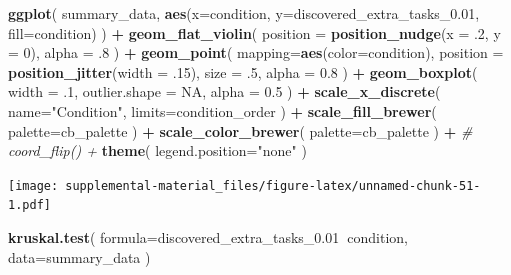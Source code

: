 \documentclass[]{book}
\newenvironment{Shaded}{\begin{snugshade}}{\end{snugshade}}
\newcommand{\CommentTok}[1]{\textcolor[rgb]{0.56,0.35,0.01}{\textit{#1}}}
\newcommand{\DataTypeTok}[1]{\textcolor[rgb]{0.13,0.29,0.53}{#1}}
\newcommand{\DecValTok}[1]{\textcolor[rgb]{0.00,0.00,0.81}{#1}}
\newcommand{\FloatTok}[1]{\textcolor[rgb]{0.00,0.00,0.81}{#1}}
\newcommand{\KeywordTok}[1]{\textcolor[rgb]{0.13,0.29,0.53}{\textbf{#1}}}
\newcommand{\NormalTok}[1]{#1}
\newcommand{\OperatorTok}[1]{\textcolor[rgb]{0.81,0.36,0.00}{\textbf{#1}}}
\newcommand{\OtherTok}[1]{\textcolor[rgb]{0.56,0.35,0.01}{#1}}
\newcommand{\StringTok}[1]{\textcolor[rgb]{0.31,0.60,0.02}{#1}}
\begin{document}
\begin{Shaded}
\begin{Highlighting}[]
\KeywordTok{ggplot}\NormalTok{(}
\NormalTok{    summary_data,}
    \KeywordTok{aes}\NormalTok{(}\DataTypeTok{x=}\NormalTok{condition, }\DataTypeTok{y=}\NormalTok{discovered_extra_tasks_}\FloatTok{0.01}\NormalTok{, }\DataTypeTok{fill=}\NormalTok{condition)}
\NormalTok{  ) }\OperatorTok{+}
\StringTok{  }\KeywordTok{geom_flat_violin}\NormalTok{(}
    \DataTypeTok{position =} \KeywordTok{position_nudge}\NormalTok{(}\DataTypeTok{x =} \FloatTok{.2}\NormalTok{, }\DataTypeTok{y =} \DecValTok{0}\NormalTok{),}
    \DataTypeTok{alpha =} \FloatTok{.8}
\NormalTok{  ) }\OperatorTok{+}
\StringTok{  }\KeywordTok{geom_point}\NormalTok{(}
    \DataTypeTok{mapping=}\KeywordTok{aes}\NormalTok{(}\DataTypeTok{color=}\NormalTok{condition),}
    \DataTypeTok{position =} \KeywordTok{position_jitter}\NormalTok{(}\DataTypeTok{width =} \FloatTok{.15}\NormalTok{),}
    \DataTypeTok{size =} \FloatTok{.5}\NormalTok{,}
    \DataTypeTok{alpha =} \FloatTok{0.8}
\NormalTok{  ) }\OperatorTok{+}
\StringTok{  }\KeywordTok{geom_boxplot}\NormalTok{(}
    \DataTypeTok{width =} \FloatTok{.1}\NormalTok{,}
    \DataTypeTok{outlier.shape =} \OtherTok{NA}\NormalTok{,}
    \DataTypeTok{alpha =} \FloatTok{0.5}
\NormalTok{  ) }\OperatorTok{+}
\StringTok{  }\KeywordTok{scale_x_discrete}\NormalTok{(}
    \DataTypeTok{name=}\StringTok{"Condition"}\NormalTok{,}
    \DataTypeTok{limits=}\NormalTok{condition_order}
\NormalTok{  ) }\OperatorTok{+}
\StringTok{  }\KeywordTok{scale_fill_brewer}\NormalTok{(}
    \DataTypeTok{palette=}\NormalTok{cb_palette}
\NormalTok{  ) }\OperatorTok{+}
\StringTok{  }\KeywordTok{scale_color_brewer}\NormalTok{(}
    \DataTypeTok{palette=}\NormalTok{cb_palette}
\NormalTok{  ) }\OperatorTok{+}
\StringTok{  }\CommentTok{# coord_flip() +}
\StringTok{  }\KeywordTok{theme}\NormalTok{(}
    \DataTypeTok{legend.position=}\StringTok{"none"}
\NormalTok{  )}
\end{Highlighting}
\end{Shaded}

\texttt{[image: supplemental-material\_files/figure-latex/unnamed-chunk-51-1.pdf]}

\begin{Shaded}
\begin{Highlighting}[]
\KeywordTok{kruskal.test}\NormalTok{(}
  \DataTypeTok{formula=}\NormalTok{discovered_extra_tasks_}\FloatTok{0.01}\OperatorTok{~}\NormalTok{condition,}
  \DataTypeTok{data=}\NormalTok{summary_data}
\NormalTok{)}
\end{Highlighting}
\end{Shaded}
\end{document}
